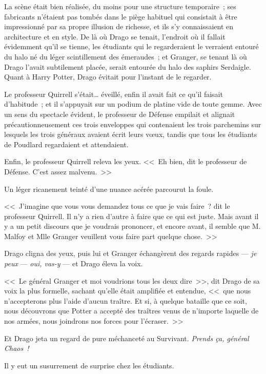 \later

La scène était bien réalisée, du moins pour une structure temporaire~; ses fabricants n'étaient pas tombés dans le piège habituel qui consistait à être impressionné par sa propre illusion de richesse, et ils s'y connaissaient en architecture et en style. De là où Drago se tenait, l'endroit où il fallait évidemment qu'il se tienne, les étudiants qui le regarderaient le verraient entouré du halo né du léger scintillement des émeraudes~; et Granger, se tenant là où Drago l'avait subtilement placée, serait entourée du halo des saphirs Serdaigle. Quant à Harry Potter, Drago évitait pour l'instant de le regarder.

Le professeur Quirrell s'était… éveillé, enfin il avait fait ce qu'il faisait d'habitude~; et il s'appuyait sur un podium de platine vide de toute gemme. Avec un sens du spectacle évident, le professeur de Défense empilait et alignait précautionneusement ces trois enveloppes qui contenaient les trois parchemins sur lesquels les trois généraux avaient écrit leurs vœux, tandis que tous les étudiants de Poudlard regardaient et attendaient.

Enfin, le professeur Quirrell releva les yeux. <<~Eh bien, dit le professeur de Défense. C'est assez malvenu.~>>

Un léger ricanement teinté d'une nuance acérée parcourut la foule.

<<~J'imagine que vous vous demandez tous ce que je vais faire~? dit le professeur Quirrell. Il n'y a rien d'autre à faire que ce qui est juste. Mais avant il y a un petit discours que je voudrais prononcer, et encore avant, il semble que M. Malfoy et Mlle Granger veuillent vous faire part quelque chose.~>>

Drago cligna des yeux, puis lui et Granger échangèrent des regards rapides — \emph{je peux} — \emph{oui, vas-y} — et Drago éleva la voix.

<<~Le général Granger et moi voudrions tous les deux dire~>>, dit Drago de sa voix la plus formelle, sachant qu'elle était amplifiée et entendue, <<~que nous n'accepterons plus l'aide d'aucun traître. Et si, à quelque bataille que ce soit, nous découvrons que Potter a accepté des traîtres venus de n'importe laquelle de nos armées, nous joindrons nos forces pour l'écraser.~>>

Et Drago jeta un regard de pure méchanceté au Survivant. \emph{Prends ça, général Chaos~!}

Il y eut un susurrement de surprise chez les étudiants.

